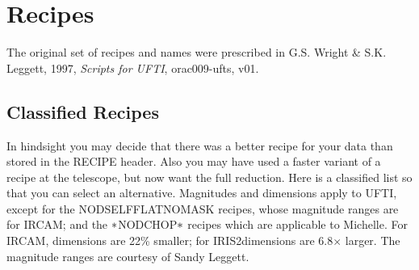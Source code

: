 \documentclass[twoside,11pt]{article}
\newcommand{\htmladdnormallink}[2]{#1}
\newcommand{\xlabel}[1]{}
\renewcommand{\_}{\texttt{\symbol{95}}}
\newcommand{\lsk}{\raisebox{-0.4ex}{\rm *}}
\newcommand{\IRCAM}{\htmladdnormallink{IRCAM}{http://www.jach.hawaii.edu/JACpublic/UKIRT/instruments/ircam/ircam3.html}}
\newcommand{\IRIS}{\htmladdnormallink{IRIS2}{http://www.aao.gov.au/iris2/}}
\newcommand{\Michelle}{\htmladdnormallink{Michelle}{http://www.jach.hawaii.edu/JACpublic/UKIRT/instruments/michelle/michelle.html}}
\begin{document}
\newpage
\section{\xlabel{recipes}Recipes\label{recipes}}

The original set of recipes and names were prescribed in
G.S. Wright \& S.K. Leggett, 1997, {\em Scripts for UFTI}, 
\htmladdnormallink{orac009-ufts, v01}
{http://www.jach.hawaii.edu/JACpublic/UKIRT/software/orac/docs/orac009-ufts-1.html}.

\subsection{\xlabel{classified_recipes}Classified Recipes}

In hindsight you may decide that there was a better recipe for your
data than stored in the RECIPE header.  Also you may have used a
faster variant of a recipe at the telescope, but now want the full
reduction.  Here is a classified list so that you can select an
alternative.  Magnitudes and dimensions apply to UFTI, except for the
NOD\_SELF\_FLAT\_NO\_MASK recipes, whose magnitude ranges are for
IRCAM; and the $\lsk$NOD\_CHOP$\lsk$ recipes which are applicable to
\Michelle.  For \IRCAM, dimensions are 22\% smaller; for \IRIS dimensions
are 6.8$\times$ larger.  The magnitude ranges are courtesy of Sandy Leggett.
\bigskip\bigskip
\end{document}
